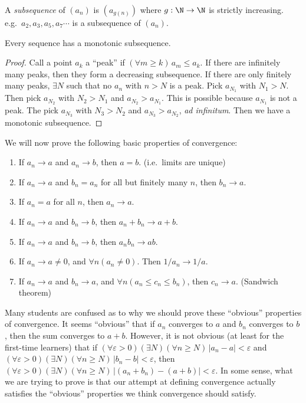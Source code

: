 \documentclass[a4paper]{article}
\begin{document}
\begin{defi}[Subsequence]
  A \emph{subsequence} of $(a_n)$ is $(a_{g(n)})$ where $g: \N\to\N$ is strictly increasing. e.g.\ $a_2, a_3, a_5, a_7\cdots$ is a subsequence of $(a_n)$.
\end{defi}

\begin{thm}
  Every sequence has a monotonic subsequence.
\end{thm}

\begin{proof}
  Call a point $a_k$ a ``peak'' if $(\forall m \geq k)\,a_m \leq a_k$. If there are infinitely many peaks, then they form a decreasing subsequence. If there are only finitely many peaks, $\exists N$ such that no $a_n$ with $n > N$ is a peak. Pick $a_{N_1}$ with $N_1 > N$. Then pick $a_{N_2}$ with $N_2 > N_1$ and $a_{N_2} > a_{N_1}$. This is possible because $a_{N_1}$ is not a peak. The pick $a_{N_3}$ with $N_3 > N_2$ and $a_{N_3}> a_{N_2}$, \emph{ad infinitum}. Then we have a monotonic subsequence.
\end{proof}

We will now prove the following basic properties of convergence:
\begin{thm}\leavevmode
  \begin{enumerate}
    \item If $a_n\to a$ and $a_n\to b$, then $a = b$. (i.e.\ limits are unique)
    \item If $a_n \to a$ and $b_n = a_n$ for all but finitely many $n$, then $b_n \to a$.
    \item If $a_n = a$ for all $n$, then $a_n \to a$.
    \item If $a_n\to a$ and $b_n\to b$, then $a_n + b_n \to a+ b$.
    \item If $a_n\to a$ and $b_n \to b$, then $a_nb_n\to ab$.
    \item If $a_n\to a\not= 0$, and $\forall n(a_n \not= 0)$. Then $1/a_n \to 1/a$.
    \item If $a_n \to a$ and $b_n \to a$, and $\forall n(a_n\leq c_n\leq b_n)$, then $c_n \to a$. (Sandwich theorem)
  \end{enumerate}
\end{thm}
Many students are confused as to why we should prove these ``obvious'' properties of convergence. It seems ``obvious'' that if $a_n$ converges to $a$ and $b_n$ converges to $b$, then the sum converges to $a + b$. However, it is not obvious (at least for the first-time learners) that if $(\forall \varepsilon > 0)(\exists N)(\forall n \geq N)\, |a_n - a| < \varepsilon$ and $(\forall \varepsilon > 0)(\exists N)(\forall n \geq N)\, |b_n - b| < \varepsilon$, then $(\forall \varepsilon > 0)(\exists N)(\forall n \geq N)\, |(a_n + b_n) - (a + b)| < \varepsilon$. In some sense, what we are trying to prove is that our attempt at defining convergence actually satisfies the ``obvious'' properties we think convergence should satisfy.
\end{document}
